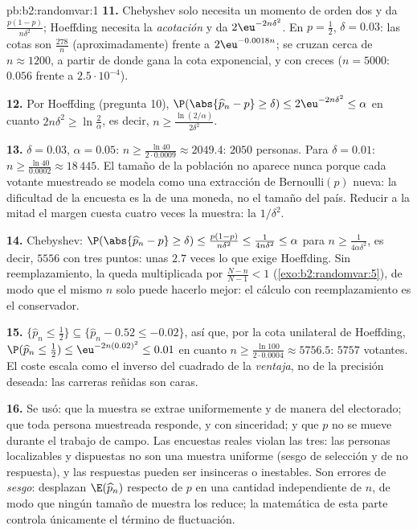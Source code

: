 \begin{solution}{pb:b2:randomvar:1}
\textbf{11.} Chebyshev solo necesita un momento de orden dos y da
$\frac{p(1-p)}{n\delta^2}$; Hoeffding necesita la \emph{acotación} y
da $2\eu^{-2n\delta^2}$. En $p = \frac12$, $\delta = 0.03$: las cotas
son $\frac{278}{n}$ (aproximadamente) frente a $2\eu^{-0.0018n}$; se
cruzan cerca de $n \approx 1200$, a partir de donde gana la cota
exponencial, y con creces ($n = 5000$: $0.056$ frente a
$2.5\cdot10^{-4}$).

\textbf{12.} Por Hoeffding (pregunta 10), $\P(\abs{\widehat p_n - p}
\geq \delta) \leq 2\eu^{-2n\delta^2} \leq \alpha$ en cuanto
$2n\delta^2 \geq \ln\frac2\alpha$, es decir, $n \geq
\frac{\ln(2/\alpha)}{2\delta^2}$.

\textbf{13.} $\delta = 0.03$, $\alpha = 0.05$: $n \geq \frac{\ln
40}{2\cdot0.0009} \approx 2049.4$: $2050$ personas. Para $\delta =
0.01$: $n \geq \frac{\ln40}{0.0002} \approx 18\,445$. El tamaño de la
población no aparece nunca porque cada votante muestreado se modela
como una extracción de Bernoulli$(p)$ nueva: la dificultad de la
encuesta es la  de una moneda, no el tamaño del país.
Reducir a la mitad el margen cuesta cuatro veces la muestra: la 
$1/\delta^2$.

\textbf{14.} Chebyshev: $\P(\abs{\widehat p_n - p} \geq \delta) \leq
\frac{p(1-p)}{n\delta^2} \leq \frac1{4n\delta^2} \leq \alpha$ para $n
\geq \frac1{4\alpha\delta^2}$, es decir, $5556$ con tres puntos: unas
$2.7$ veces lo que exige Hoeffding. Sin reemplazamiento, la
 queda multiplicada por $\frac{N - n}{N-1} < 1$
(\cref{exo:b2:randomvar:5}), de modo que el mismo $n$ solo puede
hacerlo mejor: el cálculo con reemplazamiento es el conservador.

\textbf{15.} $\{\widehat p_n \leq \frac12\} \subseteq \{\widehat p_n
- 0.52 \leq -0.02\}$, así que, por la cota unilateral de Hoeffding,
$\P(\widehat p_n \leq \tfrac12) \leq \eu^{-2n(0.02)^2} \leq 0.01$ en
cuanto $n \geq \frac{\ln 100}{2\cdot0.0004} \approx 5756.5$: $5757$
votantes. El coste escala como el inverso del cuadrado de la
\emph{ventaja}, no de la precisión deseada: las carreras reñidas son
caras.

\textbf{16.} Se usó: que la muestra se extrae uniformemente y de
manera  del electorado; que toda persona muestreada
responde, y con sinceridad; y que $p$ no se mueve durante el trabajo
de campo. Las encuestas reales violan las tres: las personas
localizables y dispuestas no son una muestra uniforme (sesgo de
selección y de no respuesta), y las respuestas pueden ser insinceras
o inestables. Son errores de \emph{sesgo}: desplazan $\E(\widehat
p_n)$ respecto de $p$ en una cantidad independiente de $n$, de modo
que ningún tamaño de muestra los reduce; la matemática de esta parte
controla únicamente el término de fluctuación.


\end{solution}
